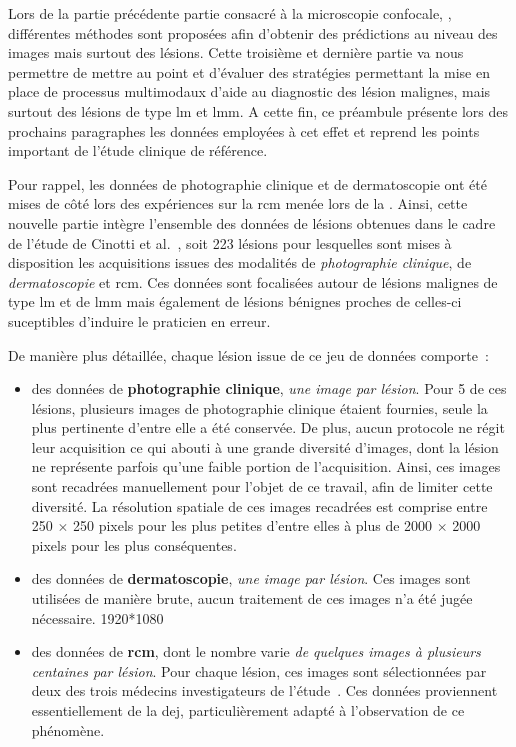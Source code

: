 \renewcommand{\thechapter}{\roman{chapter}}
\setcounter{chapter}{4}
\setcounter{figure}{0}

\label{chap:preamble_multimodal}
Lors de la partie précédente partie consacré à la microscopie confocale, , différentes méthodes sont proposées afin d'obtenir des prédictions au niveau des images mais surtout des lésions. Cette troisième et dernière partie va nous permettre de mettre au point et d'évaluer des stratégies permettant la mise en place de processus multimodaux d'aide au diagnostic des lésion malignes, mais surtout des lésions de type \gls{lm} et \gls{lmm}. A cette fin, ce préambule présente lors des prochains paragraphes les données employées à cet effet et reprend les points important de l'étude clinique de référence.\par

Pour rappel, les données de photographie clinique et de dermatoscopie ont été mises de côté lors des expériences sur la \gls{rcm} menée lors de la . Ainsi, cette nouvelle partie intègre l'ensemble des données de lésions obtenues dans le cadre de l'étude de Cinotti et al.~\cite{Cinotti2018}, soit 223 lésions pour lesquelles sont mises à disposition les acquisitions issues des modalités de \textit{photographie clinique}, de \textit{dermatoscopie} et \acrlong{rcm}. Ces données sont focalisées autour de lésions malignes de type \gls{lm} et de \gls{lmm} mais également de lésions bénignes proches de celles-ci suceptibles d'induire le praticien en erreur.\par 

De manière plus détaillée, chaque lésion issue de ce jeu de données comporte~:
\begin{itemize}
    \item des données de \textbf{photographie clinique}, \textit{une image par lésion}. Pour 5 de ces lésions, plusieurs images de photographie clinique étaient fournies, seule la plus pertinente d'entre elle a été conservée. De plus, aucun protocole ne régit leur acquisition ce qui abouti à une grande diversité d'images, dont la lésion ne représente parfois qu'une faible portion de l'acquisition. Ainsi, ces images sont recadrées manuellement pour l'objet de ce travail, afin de limiter cette diversité. La résolution spatiale de ces images recadrées est comprise entre 250 $\times$ 250 pixels pour les plus petites d'entre elles à plus de 2000 $\times$ 2000 pixels pour les plus conséquentes.
    \item des données de \textbf{dermatoscopie}, \textit{une image par lésion}. Ces images sont utilisées de manière brute, aucun traitement de ces images n'a été jugée nécessaire. 1920*1080
    \item des données de \textbf{\gls{rcm}}, dont le nombre varie \textit{de quelques images à plusieurs centaines par lésion}. Pour chaque lésion, ces images sont sélectionnées par deux des trois médecins investigateurs de l'étude~\cite{Cinotti2018}. Ces données proviennent essentiellement de la \gls{dej}, particulièrement adapté à l'observation de ce phénomène.
\end{itemize}


